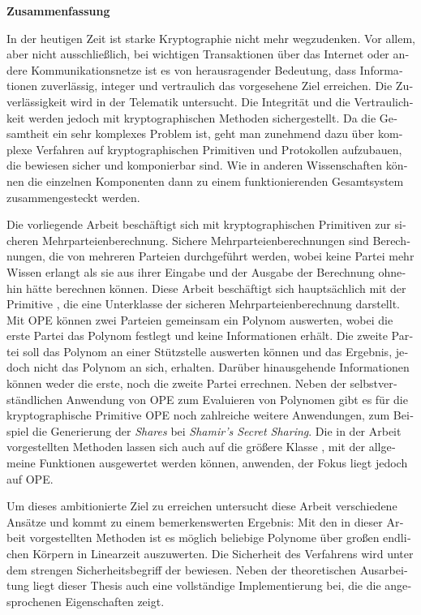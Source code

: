 \cleardoublepage
%
\noindent{}\textsf{\textbf{\huge Zusammenfassung}}
%
\bigskip{}
\begin{otherlanguage}{ngerman}

\noindent{}In der heutigen Zeit ist starke Kryptographie nicht mehr wegzudenken.
Vor allem, aber nicht ausschließlich, bei wichtigen Transaktionen über das
Internet oder andere Kommunikationsnetze ist es von herausragender Bedeutung,
dass Informationen zuverlässig, integer und vertraulich das vorgesehene Ziel
erreichen. Die Zuverlässigkeit wird in der Telematik untersucht. Die Integrität
und die Vertraulichkeit werden jedoch mit kryptographischen Methoden
sichergestellt. Da die Gesamtheit ein sehr komplexes Problem ist, geht man
zunehmend dazu über komplexe Verfahren auf kryptographischen Primitiven und
Protokollen aufzubauen, die bewiesen sicher und komponierbar sind. Wie in
anderen Wissenschaften können die einzelnen Komponenten dann zu einem
funktionierenden Gesamtsystem zusammengesteckt werden.

Die vorliegende Arbeit beschäftigt sich mit kryptographischen Primitiven zur
sicheren Mehrparteienberechnung. Sichere Mehrparteienberechnungen sind
Berechnungen, die von mehreren Parteien durchgeführt werden, wobei keine Partei
mehr Wissen erlangt als sie aus ihrer Eingabe und der Ausgabe der Berechnung
ohnehin hätte berechnen können. Diese Arbeit beschäftigt sich hauptsächlich mit
der Primitive , die eine
Unterklasse der sicheren Mehrparteienberechnung darstellt. Mit OPE können zwei
Parteien gemeinsam ein Polynom auswerten, wobei die erste Partei das Polynom
festlegt und keine Informationen erhält. Die zweite Partei soll das Polynom an
einer Stützstelle auswerten können und das Ergebnis, jedoch nicht das Polynom an
sich, erhalten. Darüber hinausgehende Informationen können weder die erste, noch
die zweite Partei errechnen. Neben der selbstverständlichen Anwendung von OPE
zum Evaluieren von Polynomen gibt es für die kryptographische Primitive OPE noch
zahlreiche weitere Anwendungen, zum Beispiel die Generierung der \emph{Shares}
bei \emph{Shamir's Secret Sharing}. Die in der Arbeit vorgestellten Methoden
lassen sich auch auf die größere Klasse , mit der allgemeine Funktionen ausgewertet werden können,
anwenden, der Fokus liegt jedoch auf OPE.

Um dieses ambitionierte Ziel zu erreichen untersucht diese Arbeit verschiedene
Ansätze und kommt zu einem bemerkenswerten Ergebnis: Mit den in dieser Arbeit
vorgestellten Methoden ist es möglich beliebige Polynome über großen endlichen
Körpern in Linearzeit auszuwerten. Die Sicherheit des Verfahrens wird unter dem
strengen Sicherheitsbegriff der  bewiesen.
Neben der theoretischen Ausarbeitung liegt dieser Thesis auch eine vollständige
Implementierung bei, die die angesprochenen Eigenschaften zeigt.

\end{otherlanguage}
%
\cleardoublepage
%
